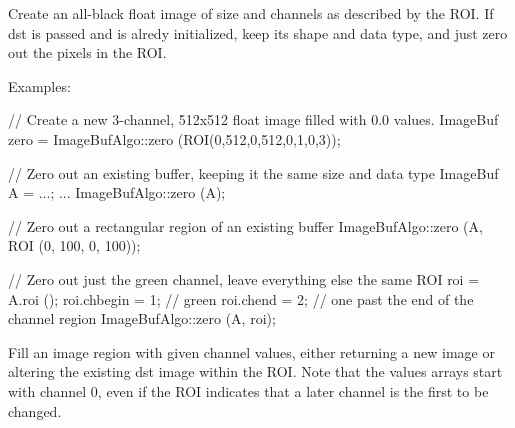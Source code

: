 \medskip

 
Create an all-black {\cf float} image of size and channels as described by
the ROI. If {\cf dst} is passed and is alredy initialized, keep its shape and
data type, and just zero out the pixels in the ROI.

\smallskip
\noindent Examples:
\begin{code}
    // Create a new 3-channel, 512x512 float image filled with 0.0 values.
    ImageBuf zero = ImageBufAlgo::zero (ROI(0,512,0,512,0,1,0,3));

    // Zero out an existing buffer, keeping it the same size and data type
    ImageBuf A = ...;
    ...
    ImageBufAlgo::zero (A);

    // Zero out a rectangular region of an existing buffer
    ImageBufAlgo::zero (A, ROI (0, 100, 0, 100));

    // Zero out just the green channel, leave everything else the same
    ROI roi = A.roi ();
    roi.chbegin = 1; // green
    roi.chend = 2;   // one past the end of the channel region
    ImageBufAlgo::zero (A, roi);
\end{code}
\apiend

 
Fill an image region with given channel values, either returning a new image
or altering the existing dst image within the ROI.  Note that the values
arrays start with channel 0, even if the ROI indicates that a later channel
is the first to be changed.

